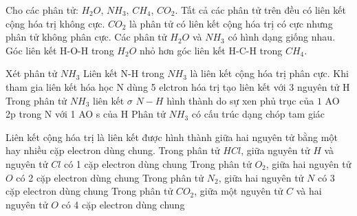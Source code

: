 \begin{ex}
	Cho các phân tử: $H_2O$, $NH_3$, $CH_4$, $CO_2$.
	\choiceTF
	{Tất cả các phân tử trên đều có liên kết cộng hóa trị không cực.}
	{\True $CO_2$ là phân tử có liên kết cộng hóa trị có cực nhưng phân tử không phân cực.}
	{Các phân tử $H_2O$ và $NH_3$ có hình dạng giống nhau.}
	{\True Góc liên kết H-O-H trong $H_2O$ nhỏ hơn góc liên kết H-C-H trong $CH_4$.}
\end{ex}
\begin{ex}
	Xét phân tử $NH_3$
	\choiceTF
	{\True Liên kết N-H trong $NH_3$ là liên kết cộng hóa trị phân cực.}
	{Khi tham gia liên kết hóa học N dùng 5 elctron hóa trị tạo liên kết với 3 nguyên tử H}
	{\True Trong phân tử $NH_3$ liên kết $\sigma$ $N-H$ hình thành do sự xen phủ trục của $1$ AO 2p trong N với 1 AO s của H}
	{\True Phân tử $NH_3$ có cấu trúc dạng chóp tam giác}
\end{ex}
\begin{ex}
	Liên kết cộng hóa trị là liên kết được hình thành giữa hai nguyên tử bằng một hay nhiều cặp electron dùng chung.
	\choiceTF
	{\True Trong phân tử $HCl$, giữa nguyên tử $H$ và nguyên tử $Cl$ có 1 cặp electron dùng chung}
	{\True Trong phân tử $O_2$, giữa hai nguyên tử $O$ có 2 cặp electron dùng chung}
	{\True Trong phân tử $N_2$, giữa hai nguyên tử $N$ có 3 cặp electron dùng chung}
	{\True Trong phân tử $CO_2$, giữa một nguyên tử $C$ và hai nguyên tử $O$ có 4 cặp electron dùng chung}
	\loigiai{}
\end{ex}
